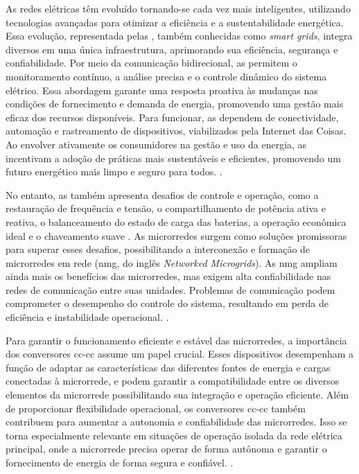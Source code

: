 As redes elétricas têm evoluído tornando-se cada vez mais inteligentes, utilizando tecnologias avançadas para otimizar a eficiência e a sustentabilidade energética. Essa evolução, representada pelas , também conhecidas como \textit{smart grids}, integra diversos  em uma única infraestrutura, aprimorando sua eficiência, segurança e confiabilidade. Por meio da comunicação bidirecional, as  permitem o monitoramento contínuo, a análise precisa e o controle dinâmico do sistema elétrico. Essa abordagem garante uma resposta proativa às mudanças nas condições de fornecimento e demanda de energia, promovendo uma gestão mais eficaz dos recursos disponíveis. Para funcionar, as  dependem de conectividade, automação e rastreamento de dispositivos, viabilizados pela Internet das Coisas. Ao envolver ativamente os consumidores na gestão e uso da energia, as  incentivam a adoção de práticas mais sustentáveis e eficientes, promovendo um futuro energético mais limpo e seguro para todos. \citep{Bhavani2022, Wadi2024}.

No entanto, as  também apresenta desafios de controle e operação, como a restauração de frequência e tensão, o compartilhamento de potência ativa e reativa, o balanceamento do estado de carga das baterias, a operação econômica ideal e o chaveamento suave \citep{Zhou2020}. As microrredes surgem como soluções promissoras para superar esses desafios, possibilitando a interconexão e formação de microrredes em rede (\acrshort{nmg}, do inglês \textit{Networked Microgrids}). As \acrshort{nmg} ampliam ainda mais os benefícios das microrredes, mas exigem alta confiabilidade nas redes de comunicação entre suas unidades. Problemas de comunicação podem comprometer o desempenho do controle do sistema, resultando em perda de eficiência e instabilidade operacional. \citep{Zhou2020}.

Para garantir o funcionamento eficiente e estável das microrredes, a importância dos conversores \acrshort{cc}-\acrshort{cc} assume um papel crucial. Esses dispositivos desempenham a função de adaptar as características das diferentes fontes de energia e cargas conectadas à microrrede, e podem garantir a compatibilidade entre os diversos elementos da microrrede possibilitando sua integração e operação eficiente. Além de proporcionar flexibilidade operacional, os conversores \acrshort{cc}-\acrshort{cc} também contribuem para aumentar a autonomia e confiabilidade das microrredes. Isso se torna especialmente relevante em situações de operação isolada da rede elétrica principal, onde a microrrede precisa operar de forma autônoma e garantir o fornecimento de energia de forma segura e confiável. \citep{bessa2022}.

